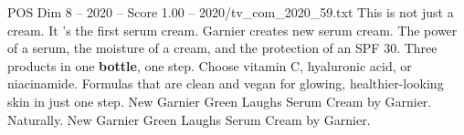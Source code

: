 \begin{textsample}{POS Dim 8 – 2020 – Score 1.00 – 2020/tv\_com\_2020\_59.txt}  \label{ex:f8_pos_028}
This is not just a cream.
It 's the first serum cream.
Garnier creates new serum cream.
The power of a serum, the moisture of a cream, and the protection of an SPF 30.
Three products in one \textbf{bottle}, one step.
Choose vitamin C, hyaluronic acid, or niacinamide.
Formulas that are clean and vegan for glowing, healthier-looking skin in just one step.
New Garnier Green Laughs Serum Cream by Garnier.
Naturally.
New Garnier Green Laughs Serum Cream by Garnier.

\end{textsample}
